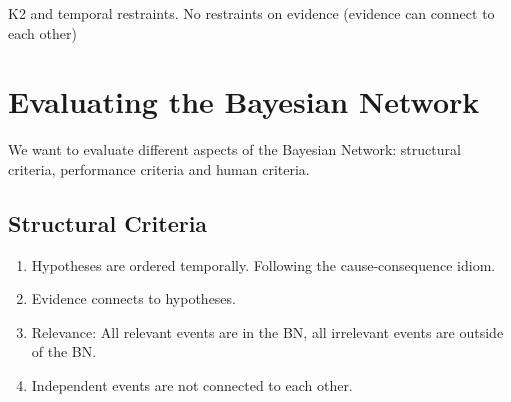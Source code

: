 K2 and temporal restraints.  No restraints on evidence (evidence can connect to each other)



\section{Evaluating the Bayesian Network}

We want to evaluate different aspects of the Bayesian Network: structural criteria, performance criteria and human criteria.

\subsection{Structural Criteria}
\begin{enumerate}
\item Hypotheses are ordered temporally. Following the cause-consequence idiom.
\item Evidence connects to hypotheses.
\item Relevance: All relevant events are in the BN, all irrelevant events are outside of the BN.
\item Independent events are not connected to each other.
\end{enumerate}

